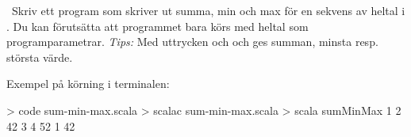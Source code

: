 \begin{ConceptConnections}

\end{ConceptConnections}


\SOLUTION

\TaskSolved \what

\Subtask

\begin{ConceptConnections}

\end{ConceptConnections}

\Subtask

\begin{ConceptConnections}

\end{ConceptConnections}

\Subtask

\begin{ConceptConnections}

\end{ConceptConnections}

\QUESTEND








\QUESTBEGIN

\Task \what~Skriv ett program som skriver ut summa, min och max för en sekvens av heltal i . Du kan förutsätta att programmet bara körs med heltal som programparametrar. \emph{Tips:} Med uttrycken  och  och  ges summan, minsta resp. största värde.

Exempel på körning i terminalen:
\begin{REPL}
> code sum-min-max.scala
> scalac sum-min-max.scala
> scala sumMinMax 1 2 42 3 4
52 1 42
\end{REPL}

\SOLUTION

\TaskSolved \what~


\QUESTEND






